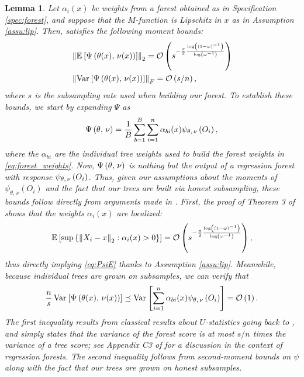 \documentclass[aos]{imsart}
\theoremstyle{plain}
\newtheorem{lemm}[prop]{Lemma}
\theoremstyle{definition}
\theoremstyle{remark}
\begin{document}
\begin{CJK}{UTF8}{gbsn}
\begin{appendix}
\begin{lemm}
\label{lemm:moments}
Let $\alpha_i(x)$ be weights from a forest obtained as in Specification \ref{spec:forest},
and suppose that the $M$-function is Lipschitz in $x$ as in Assumption \ref{assu:lip}.
Then,  satisfies the following moment bounds:
\begin{align}
\label{eq:PsiE}
&\Norm{\EE{\Psi\p{\theta(x), \, \nu(x)}}}_2 =  \oo\p{s^{-\frac{\pi}{2}\frac{\log\p{\p{1 - \omega}^{-1}}}{\log\p{\omega^{-1}}}}} \\
\label{eq:PsiV}
&\Norm{\Var{\Psi\p{\theta(x), \, \nu(x)}}}_F = \oo\p{s/n},
\end{align}
where $s$ is the subsampling rate used when building our forest.
\proof
To establish these bounds, we start by expanding $\Psi$ as
\begin{equation}
\Psi\p{\theta, \, \nu} = \frac{1}{B} \sum_{b = 1}^B \sum_{i = 1}^n \alpha_{bi}(x) \psi_{\theta, \, \nu}\p{O_i},
\end{equation}
where the $\alpha_{bi}$ are the individual tree weights used to build the forest weights in \eqref{eq:forest_weights}.
Now, $\Psi\left(\theta, \, \nu\right)$ is nothing but the output of a regression forest with response
$\psi_{\theta, \, \nu}\left(O_i\right)$. Thus, given our assumptions about the moments of $\psi_{\theta, \, \nu}(O_i)$
and the fact that our trees are built via honest subsampling, these bounds follow directly from arguments
made in \citet{wager2015estimation}. First, the proof of Theorem 3 of \citet{wager2015estimation}
shows that the weights $\alpha_i(x)$ are localized:
\begin{equation}
\label{eq:local_weights}
\EE{\sup\cb{\Norm{X_i - x}_2 : \alpha_i(x) > 0}} = \oo\p{s^{-\frac{\pi}{2}\frac{\log\p{\p{1 - \omega}^{-1}}}{\log\p{\omega^{-1}}}}},
\end{equation}
thus directly implying \eqref{eq:PsiE} thanks to Assumption \ref{assu:lip}.
Meanwhile, because individual trees are grown on subsamples,
we can verify that
\begin{equation}
\frac{n}{s} \Var{\Psi\p{\theta(x), \, \nu(x)}} \preceq \Var{\sum_{i = 1}^n \alpha_{bi}(x) \psi_{\theta, \, \nu}\p{O_i}} = \oo\p{1}.
\end{equation}
The first inequality results from classical results about $U$-statistics going back to
\citet{hoeffding1948class}, and simply states that the variance of the forest score is at most
$s/n$ times the variance of a tree score; see Appendix C3 of \citet{wager2015estimation} for
a discussion in the context of regression forests.
The second inequality follows from second-moment bounds on $\psi$
along with the fact that our trees are grown on honest subsamples.
\endproof
\end{lemm}



\end{appendix}
\end{CJK}
\end{document}
